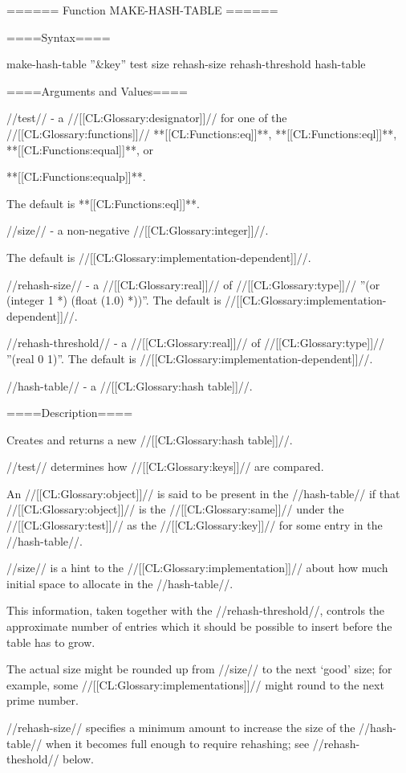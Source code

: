 ====== Function MAKE-HASH-TABLE ======

====Syntax====

\DefunWithValues make-hash-table {''&key'' test size rehash-size rehash-threshold} {hash-table}

====Arguments and Values====

//test// - a //[[CL:Glossary:designator]]// for one of the //[[CL:Glossary:functions]]// **[[CL:Functions:eq]]**, **[[CL:Functions:eql]]**, **[[CL:Functions:equal]]**, or

**[[CL:Functions:equalp]]**.

The default is **[[CL:Functions:eql]]**.

//size// - a non-negative //[[CL:Glossary:integer]]//.

The default is //[[CL:Glossary:implementation-dependent]]//.

//rehash-size// - a //[[CL:Glossary:real]]// of //[[CL:Glossary:type]]// ''(or (integer 1 *) (float (1.0) *))''. The default is //[[CL:Glossary:implementation-dependent]]//.


//rehash-threshold// - a //[[CL:Glossary:real]]// of //[[CL:Glossary:type]]// ''(real 0 1)''. The default is //[[CL:Glossary:implementation-dependent]]//.



//hash-table// - a //[[CL:Glossary:hash table]]//.

====Description====

Creates and returns a new //[[CL:Glossary:hash table]]//.

//test// determines how //[[CL:Glossary:keys]]// are compared.

An //[[CL:Glossary:object]]// is said to be present in the //hash-table// if that //[[CL:Glossary:object]]// is the //[[CL:Glossary:same]]// under the //[[CL:Glossary:test]]// as the //[[CL:Glossary:key]]// for some entry in the //hash-table//.

//size// is a hint to the //[[CL:Glossary:implementation]]// about how much initial space to allocate in the //hash-table//.

This information, taken together with the //rehash-threshold//, controls the approximate number of entries which it should be possible to insert before the table has to grow.

The actual size might be rounded up from //size// to the next `good' size; for example, some //[[CL:Glossary:implementations]]// might round to the next prime number.

//rehash-size// specifies a minimum amount to increase the size of the //hash-table// when it becomes full enough to require rehashing; see //rehash-theshold// below.

